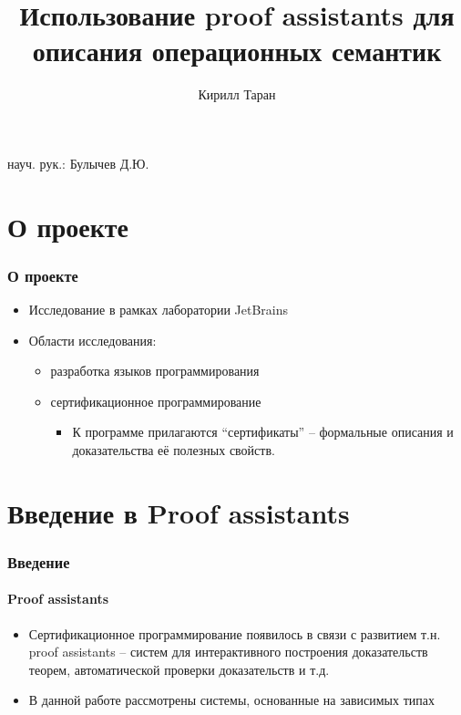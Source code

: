 \documentclass[10pt,pdf,hyperref={unicode}]{beamer}
\begin{document}
      \title[Proof assistants и семантики]{Использование proof assistants для описания операционных семантик}
      \author[Кирилл Таран]{Кирилл Таран}

      \begin{frame}
         \titlepage
         \hfill науч. рук.: Булычев Д.Ю.
      \end{frame}

      \section{О проекте}

      \begin{frame}
         \frametitle{О проекте}
         \begin{itemize}
            \item Исследование в рамках лаборатории JetBrains
            \item Области исследования:
               \begin{itemize}
                  \item разработка языков программирования
                  \item сертификационное программирование
                     \begin{itemize}
                     \item К программе прилагаются ``сертификаты'' -- формальные описания
                      и доказательства её полезных свойств.
                     \end{itemize}
               \end{itemize}
         \end{itemize}
      \end{frame}

      \section{Введение в Proof assistants}

      \begin{frame}
         \frametitle{Введение}
         \framesubtitle{Proof assistants}
         \begin{itemize}
            \item Сертификационное программирование появилось
            в связи с развитием т.н. proof assistants -- систем
            для интерактивного построения доказательств теорем,
            автоматической проверки доказательств и т.д.
            \item В данной работе рассмотрены системы,
            основанные на зависимых типах
         \end{itemize}
      \end{frame}
\end{document}
